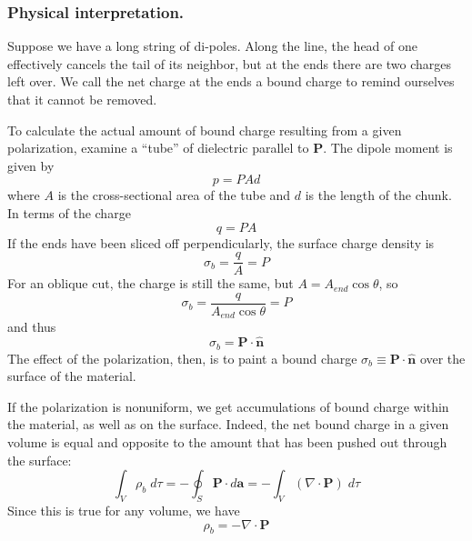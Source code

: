 \documentclass[../../../main.tex]{subfiles}
\begin{document}
\subsubsection{Physical interpretation.} Suppose we have a long string of di-poles. Along the line, the head of one effectively cancels the tail of its neighbor, but at the ends there are two charges left over. We call the net charge at the ends a bound charge to remind ourselves that it cannot be removed. 

To calculate the actual amount of bound charge resulting from a given polarization, examine a “tube” of dielectric parallel to $\mathbf{P}$. The dipole moment is given by
\begin{equation*}
    p=PAd
\end{equation*}
where $A$ is the cross-sectional area of the tube and $d$ is the length of the chunk. In terms of the charge
\begin{equation*}
    q=PA
\end{equation*}
If the ends have been sliced off perpendicularly, the surface charge density is
\begin{equation*}
    \sigma_b=\frac{q}{A}=P
\end{equation*}
For an oblique cut, the charge is still the same, but $A = A_{end} \cos \theta$, so
\begin{equation*}
    \sigma_b=\frac{q}{A_{end} \cos \theta}=P
\end{equation*}
and thus
\begin{equation*}
    \sigma_b=\mathbf{P}\cdot\mathbf{\hat{n}}
\end{equation*}
The effect of the polarization, then, is to paint a bound charge $\sigma_b\equiv \mathbf{P} \cdot \mathbf{\hat{n}} $ over the surface of the material.

If the polarization is nonuniform, we get accumulations of bound charge within the material, as well as on the surface. Indeed, the net bound charge in a given volume is equal and opposite to the amount that has been pushed out through the surface:
\begin{equation*}
    \int_V\rho_b\;d\tau=-\oint_S\mathbf{P}\cdot d\mathbf{a}=-\int_V(\nabla\cdot\mathbf{P})\;d\tau
\end{equation*}
Since this is true for any volume, we have
\begin{equation*}
    \rho_b=-\nabla\cdot\mathbf{P}
\end{equation*}
\end{document}
